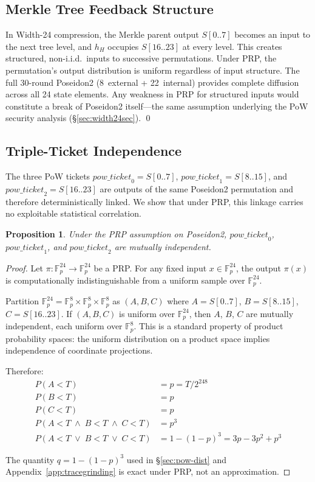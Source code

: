 \documentclass[11pt,a4paper]{article}
\newtheorem{proposition}{Proposition}
\begin{document}
\subsection{Merkle Tree Feedback Structure}

In Width-24 compression, the Merkle parent output $S[0..7]$ becomes an input to the next tree level, and $h_H$ occupies $S[16..23]$ at every level. This creates structured, non-i.i.d.\ inputs to successive permutations. Under PRP, the permutation's output distribution is uniform regardless of input structure. The full 30-round Poseidon2 (8~external + 22~internal) provides complete diffusion across all 24 state elements. Any weakness in PRP for structured inputs would constitute a break of Poseidon2 itself---the same assumption underlying the PoW security analysis (\S\ref{sec:width24sec}). \qed

\subsection{Triple-Ticket Independence}
\label{app:triple-ticket}

The three PoW tickets $\mathit{pow\_ticket}_0 = S[0..7]$, $\mathit{pow\_ticket}_1 = S[8..15]$, and $\mathit{pow\_ticket}_2 = S[16..23]$ are outputs of the same Poseidon2 permutation and therefore deterministically linked. We show that under PRP, this linkage carries no exploitable statistical correlation.

\begin{proposition}
Under the PRP assumption on Poseidon2, $\mathit{pow\_ticket}_0$, $\mathit{pow\_ticket}_1$, and $\mathit{pow\_ticket}_2$ are mutually independent.
\end{proposition}

\begin{proof}
Let $\pi: \mathbb{F}_p^{24} \to \mathbb{F}_p^{24}$ be a PRP. For any fixed input $x \in \mathbb{F}_p^{24}$, the output $\pi(x)$ is computationally indistinguishable from a uniform sample over $\mathbb{F}_p^{24}$.

Partition $\mathbb{F}_p^{24} = \mathbb{F}_p^8 \times \mathbb{F}_p^8 \times \mathbb{F}_p^8$ as $(A, B, C)$ where $A = S[0..7]$, $B = S[8..15]$, $C = S[16..23]$. If $(A, B, C)$ is uniform over $\mathbb{F}_p^{24}$, then $A$, $B$, $C$ are mutually independent, each uniform over $\mathbb{F}_p^8$. This is a standard property of product probability spaces: the uniform distribution on a product space implies independence of coordinate projections.

Therefore:
\begin{align*}
P(A < T) &= p = T/2^{248} \\
P(B < T) &= p \\
P(C < T) &= p \\
P(A < T \;\wedge\; B < T \;\wedge\; C < T) &= p^3 \\
P(A < T \;\vee\; B < T \;\vee\; C < T) &= 1 - (1-p)^3 = 3p - 3p^2 + p^3
\end{align*}

The quantity $q = 1 - (1-p)^3$ used in \S\ref{sec:pow-dist} and Appendix~\ref{app:tracegrinding} is exact under PRP, not an approximation.
\end{proof}
\end{document}
